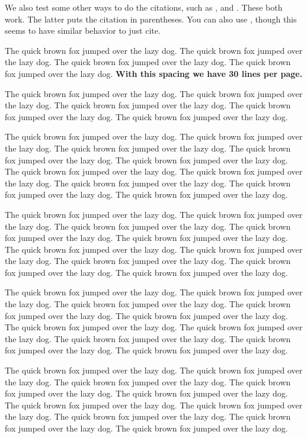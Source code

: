 \documentclass[12pt]{article}
\begin{document}
We also test some other ways to do the citations, such as \cite{Chi81},
and \citep{Campbell02}. These both work. The latter puts the citation in
parentheses. You can also use \citet{Chi81}, though this seems to have
similar behavior to just cite.

The quick brown fox jumped over the lazy dog. The quick brown fox jumped
over the lazy dog. The quick brown fox jumped over the lazy dog. The
quick brown fox jumped over the lazy dog. \textbf{With this spacing we
have 30 lines per page.}

The quick brown fox jumped over the lazy dog. The quick brown fox jumped
over the lazy dog. The quick brown fox jumped over the lazy dog. The
quick brown fox jumped over the lazy dog. The quick brown fox jumped
over the lazy dog.

The quick brown fox jumped over the lazy dog. The quick brown fox jumped
over the lazy dog. The quick brown fox jumped over the lazy dog. The
quick brown fox jumped over the lazy dog. The quick brown fox jumped
over the lazy dog. The quick brown fox jumped over the lazy dog. The
quick brown fox jumped over the lazy dog. The quick brown fox jumped
over the lazy dog. The quick brown fox jumped over the lazy dog. The
quick brown fox jumped over the lazy dog.

The quick brown fox jumped over the lazy dog. The quick brown fox jumped
over the lazy dog. The quick brown fox jumped over the lazy dog. The
quick brown fox jumped over the lazy dog. The quick brown fox jumped
over the lazy dog. The quick brown fox jumped over the lazy dog. The
quick brown fox jumped over the lazy dog. The quick brown fox jumped
over the lazy dog. The quick brown fox jumped over the lazy dog. The
quick brown fox jumped over the lazy dog.

The quick brown fox jumped over the lazy dog. The quick brown fox jumped
over the lazy dog. The quick brown fox jumped over the lazy dog. The
quick brown fox jumped over the lazy dog. The quick brown fox jumped
over the lazy dog. The quick brown fox jumped over the lazy dog. The
quick brown fox jumped over the lazy dog. The quick brown fox jumped
over the lazy dog. The quick brown fox jumped over the lazy dog. The
quick brown fox jumped over the lazy dog.

The quick brown fox jumped over the lazy dog. The quick brown fox jumped
over the lazy dog. The quick brown fox jumped over the lazy dog. The
quick brown fox jumped over the lazy dog. The quick brown fox jumped
over the lazy dog. The quick brown fox jumped over the lazy dog. The
quick brown fox jumped over the lazy dog. The quick brown fox jumped
over the lazy dog. The quick brown fox jumped over the lazy dog. The
quick brown fox jumped over the lazy dog.
\end{document}
